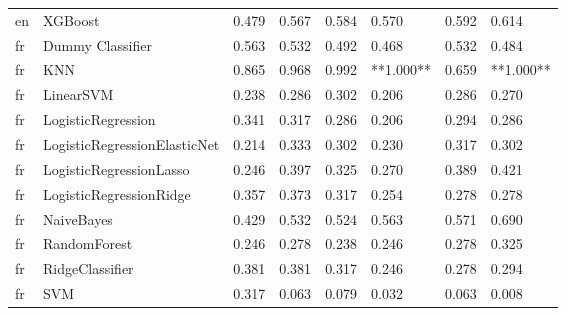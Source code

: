 \begin{tabular}{llllllll}
      en &                      XGBoost & 0.479 &                     0.567 &                 0.584 &                  0.570 &                                   0.592 &     0.614 \\
      fr &             Dummy Classifier & 0.563 &                     0.532 &                 0.492 &                  0.468 &                                   0.532 &     0.484 \\
      fr &                          KNN & 0.865 &                     0.968 &                 0.992 &              **1.000** &                                   0.659 & **1.000** \\
      fr &                    LinearSVM & 0.238 &                     0.286 &                 0.302 &                  0.206 &                                   0.286 &     0.270 \\
      fr &           LogisticRegression & 0.341 &                     0.317 &                 0.286 &                  0.206 &                                   0.294 &     0.286 \\
      fr & LogisticRegressionElasticNet & 0.214 &                     0.333 &                 0.302 &                  0.230 &                                   0.317 &     0.302 \\
      fr &      LogisticRegressionLasso & 0.246 &                     0.397 &                 0.325 &                  0.270 &                                   0.389 &     0.421 \\
      fr &      LogisticRegressionRidge & 0.357 &                     0.373 &                 0.317 &                  0.254 &                                   0.278 &     0.278 \\
      fr &                   NaiveBayes & 0.429 &                     0.532 &                 0.524 &                  0.563 &                                   0.571 &     0.690 \\
      fr &                 RandomForest & 0.246 &                     0.278 &                 0.238 &                  0.246 &                                   0.278 &     0.325 \\
      fr &              RidgeClassifier & 0.381 &                     0.381 &                 0.317 &                  0.246 &                                   0.278 &     0.294 \\
      fr &                          SVM & 0.317 &                     0.063 &                 0.079 &                  0.032 &                                   0.063 &     0.008 \\

\end{tabular}
